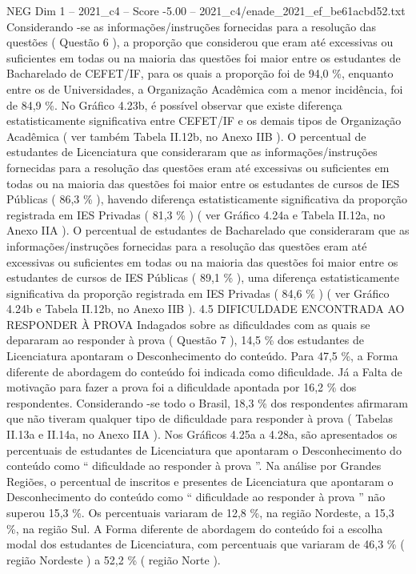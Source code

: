 \begin{textsample}{NEG Dim 1 – 2021\_c4 – Score -5.00 – 2021\_c4/enade\_2021\_ef\_be61acbd52.txt}
Considerando -se as informações/instruções fornecidas para a resolução das questões ( Questão 6 ), a proporção que considerou que eram até excessivas ou suficientes em todas ou na maioria das questões foi maior entre os estudantes de Bacharelado de CEFET/IF, para os quais a proporção foi de 94,0 \%, enquanto entre os de Universidades, a Organização Acadêmica com a menor incidência, foi de 84,9 \%.
No Gráfico 4.23b, é possível observar que existe diferença estatisticamente significativa entre CEFET/IF e os demais tipos de Organização Acadêmica ( ver também Tabela II.12b, no Anexo IIB ).
O percentual de estudantes de Licenciatura que consideraram que as informações/instruções fornecidas para a resolução das questões eram até excessivas ou suficientes em todas ou na maioria das questões foi maior entre os estudantes de cursos de IES Públicas ( 86,3 \% ), havendo diferença estatisticamente significativa da proporção registrada em IES Privadas ( 81,3 \% ) ( ver Gráfico 4.24a e Tabela II.12a, no Anexo IIA ).
O percentual de estudantes de Bacharelado que consideraram que as informações/instruções fornecidas para a resolução das questões eram até excessivas ou suficientes em todas ou na maioria das questões foi maior entre os estudantes de cursos de IES Públicas ( 89,1 \% ), uma diferença estatisticamente significativa da proporção registrada em IES Privadas ( 84,6 \% ) ( ver Gráfico 4.24b e Tabela II.12b, no Anexo IIB ). 4.5 DIFICULDADE ENCONTRADA AO RESPONDER À PROVA Indagados sobre as dificuldades com as quais se depararam ao responder à prova ( Questão 7 ), 14,5 \% dos estudantes de Licenciatura apontaram o Desconhecimento do conteúdo.
Para 47,5 \%, a Forma diferente de abordagem do conteúdo foi indicada como dificuldade.
Já a Falta de motivação para fazer a prova foi a dificuldade apontada por 16,2 \% dos respondentes.
Considerando -se todo o Brasil, 18,3 \% dos respondentes afirmaram que não tiveram qualquer tipo de dificuldade para responder à prova ( Tabelas II.13a e II.14a, no Anexo IIA ).
Nos Gráficos 4.25a a 4.28a, são apresentados os percentuais de estudantes de Licenciatura que apontaram o Desconhecimento do conteúdo como “ dificuldade ao responder à prova ”.
Na análise por Grandes Regiões, o percentual de inscritos e presentes de Licenciatura que apontaram o Desconhecimento do conteúdo como “ dificuldade ao responder à prova ” não superou 15,3 \%.
Os percentuais variaram de 12,8 \%, na região Nordeste, a 15,3 \%, na região Sul.
A Forma diferente de abordagem do conteúdo foi a escolha modal dos estudantes de Licenciatura, com percentuais que variaram de 46,3 \% ( região Nordeste ) a 52,2 \% ( região Norte ).

\end{textsample}
